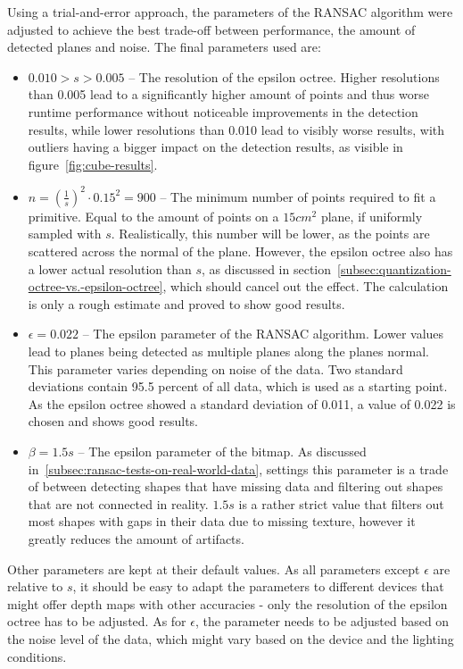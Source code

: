 Using a trial-and-error approach, the parameters of the RANSAC algorithm were adjusted to achieve the best trade-off between
performance, the amount of detected planes and noise.
The final parameters used are:
\begin{itemize}
    \item $0.010>s>0.005$ -- The resolution of the epsilon octree.
    Higher resolutions than 0.005 lead to a significantly higher amount of points and thus worse runtime performance without noticeable improvements in the detection results,
    while lower resolutions than 0.010 lead to visibly worse results, with outliers having a bigger impact on the detection results, as visible in figure~\ref{fig:cube-results}.
    \item $n=\left(\frac{1}{s}\right)^2\cdot0.15^2=900$ -- The minimum number of points required to fit a primitive.
    Equal to the amount of points on a $15cm^2$ plane, if uniformly sampled with $s$.
    Realistically, this number will be lower, as the points are scattered across the normal of the plane.
    However, the epsilon octree also has a lower actual resolution than $s$, as discussed in section~\ref{subsec:quantization-octree-vs.-epsilon-octree},
    which should cancel out the effect.
    The calculation is only a rough estimate and proved to show good results.
    \item $\epsilon=0.022$ -- The epsilon parameter of the RANSAC algorithm.
    Lower values lead to planes being detected as multiple planes along the planes normal.
    This parameter varies depending on noise of the data.
    Two standard deviations contain 95.5 percent of all data, which is used as a starting point.
    As the epsilon octree showed a standard deviation of 0.011, a value of 0.022 is chosen and shows good results.
    \item $\beta=1.5s$ -- The epsilon parameter of the bitmap.
    As discussed in~\ref{subsec:ransac-tests-on-real-world-data}, settings this parameter is a trade of between detecting shapes that have missing data and filtering out shapes that are not connected in reality.
    $1.5s$ is a rather strict value that filters out most shapes with gaps in their data due to missing texture, however it greatly reduces the amount of artifacts.
\end{itemize}
Other parameters are kept at their default values.
As all parameters except $\epsilon$ are relative to $s$,
it should be easy to adapt the parameters to different devices that might offer depth maps with other accuracies -
only the resolution of the epsilon octree has to be adjusted.
As for $\epsilon$, the parameter needs to be adjusted based on the noise level of the data, which might vary based on the device and the lighting conditions.


